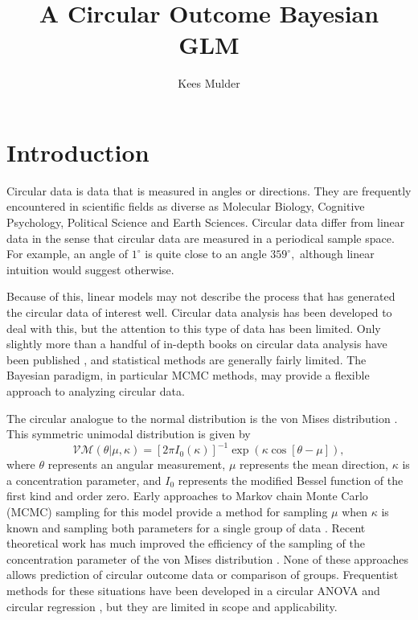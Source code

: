 \documentclass[12pt,a4paper]{article}\usepackage[]{graphicx}\usepackage[]{color}
\author{Kees Mulder}
\title{A Circular Outcome Bayesian GLM}
\begin{document}
\maketitle




\section{Introduction}

Circular data is data that is measured in angles or directions. They are frequently encountered in scientific fields as diverse as Molecular Biology, Cognitive Psychology, Political Science \citep{gill2010} and Earth Sciences. Circular data differ from linear data in the sense that circular data are measured in a periodical sample space. For example, an angle of $1^{\circ}$ is quite close to an angle $359^{\circ},$ although linear intuition would suggest otherwise.

Because of this, linear models may not describe the process that has generated the circular data of interest well. Circular data analysis has been developed to deal with this, but the attention to this type of data has been limited. Only slightly more than a handful of in-depth books on circular data analysis have been published \citep{fisher1995statistical,mardia1999directional,pewsey2013circular}, and statistical methods are generally fairly limited. The Bayesian paradigm, in particular MCMC methods, may provide a flexible approach to analyzing circular data.

The circular analogue to the normal distribution is the von Mises distribution \citep{von1918ganzzahligkeit}. This symmetric unimodal distribution is given by
\begin{equation}
\mathcal{VM}(\theta \vert \mu, \kappa) = \left[ 2 \pi I_0(\kappa) \right]^{-1}
\exp \left( \kappa \cos \left[ \theta - \mu \right] \right),
\end{equation}
where $\theta$ represents an angular measurement, $\mu$ represents the mean direction, $\kappa$ is a concentration parameter, and $I_0$ represents the modified Bessel function of the first kind and order zero. Early approaches to Markov chain Monte Carlo (MCMC) sampling for this model provide a method for sampling $\mu$ when $\kappa$ is known \citep{mardia1976bayesian} and sampling both parameters for a single group of data \citep{damien1999fullbayes}. Recent theoretical work has much improved the efficiency of the sampling of the concentration parameter of the von Mises distribution \citep{forbes2014fast}. None of these approaches allows prediction of circular outcome data or comparison of groups. Frequentist methods for these situations have been developed in a circular ANOVA \citep{harrison1986analysis,harrison1988development} and circular regression \citep{fisher1992regression}, but they are limited in scope and applicability.
\end{document}
